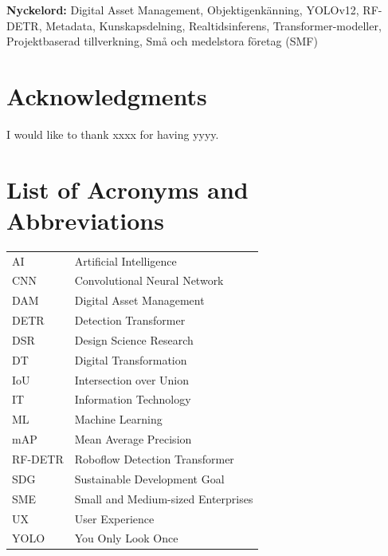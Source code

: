 \documentclass[a4paper,10pt,twocolumn]{article}
\numberwithin{figure}{section}
\numberwithin{table}{section}
\begin{document}
\vspace{0.3cm}
\textbf{Nyckelord:} 
Digital Asset Management, Objektigenkänning, YOLOv12, RF-DETR, Metadata, Kunskapsdelning, Realtidsinferens, Transformer-modeller, Projektbaserad tillverkning, Små och medelstora företag (SMF)

\newpage

\section*{Acknowledgments}
I would like to thank xxxx for having yyyy.

\newpage
{} 
\onecolumn
\tableofcontents
\newpage

\newpage
{} 
{}
\listoffigures
\newpage
{} 
{}
\listoftables

\newpage
{}
{}
\section*{List of Acronyms and Abbreviations}
\vspace{0.2cm} %

\renewcommand{\arraystretch}{1.2} %
\begin{flushleft}
\begin{longtable}{p{5cm} p{12cm}}

AI     & Artificial Intelligence \\
CNN    & Convolutional Neural Network \\
DAM    & Digital Asset Management \\
DETR   & Detection Transformer \\
DSR    & Design Science Research \\
DT     & Digital Transformation \\
IoU    & Intersection over Union \\
IT     & Information Technology \\
ML     & Machine Learning \\
mAP    & Mean Average Precision \\
RF-DETR & Roboflow Detection Transformer \\
SDG    & Sustainable Development Goal \\
SME    & Small and Medium-sized Enterprises \\
UX     & User Experience \\
YOLO   & You Only Look Once \\

\end{longtable}
\end{flushleft}
\end{document}
